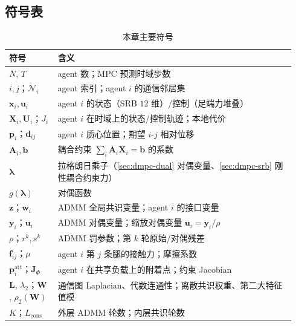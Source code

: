 \subsection*{符号表}
\begin{table}[H]\centering\small
\caption{本章主要符号}
\label{tab:dmpc-symbols}
\begin{tabular}{p{0.16\linewidth}p{0.78\linewidth}}
\toprule
符号 & 含义 \\
\midrule
$N$, $T$ & agent 数；MPC 预测时域步数 \\
$i,j$；$\mathcal{N}_i$ & agent 索引；agent $i$ 的通信邻居集 \\
$\mathbf{x}_i,\mathbf{u}_i$ & agent $i$ 的状态（SRB $12$ 维）/控制（足端力堆叠） \\
$\mathbf{X}_i,\mathbf{U}_i$；$J_i$ & agent $i$ 在时域上的状态/控制轨迹；本地代价 \\
$\mathbf{p}_i$；$\mathbf{d}_{ij}$ & agent $i$ 质心位置；期望 $i$-$j$ 相对位移 \\
$\mathbf{A}_i,\mathbf{b}$ & 耦合约束 $\sum_i \mathbf{A}_i\mathbf{X}_i=\mathbf{b}$ 的系数 \\
$\boldsymbol{\lambda}$ & 拉格朗日乘子（\cref{sec:dmpc-dual} 对偶变量、\cref{sec:dmpc-srb} 刚性耦合约束力） \\
$g(\boldsymbol{\lambda})$ & 对偶函数 \\
$\mathbf{z}$；$\mathbf{w}_i$ & ADMM 全局共识变量；agent $i$ 的接口变量 \\
$\mathbf{y}_i$；$\mathbf{u}_i$ & ADMM 对偶变量；缩放对偶变量 $\mathbf{u}_i=\mathbf{y}_i/\rho$ \\
$\rho$；$r^k,s^k$ & ADMM 罚参数；第 $k$ 轮原始/对偶残差 \\
$\mathbf{f}_{ij}$；$\mu$ & agent $i$ 第 $j$ 条腿的接触力；摩擦系数 \\
$\mathbf{p}_i^{\text{att}}$；$\mathbf{J}_\Phi$ & agent $i$ 在共享负载上的附着点；约束 Jacobian \\
$\mathbf{L}$, $\lambda_2$；$\mathbf{W}$, $\rho_2(\mathbf{W})$ & 通信图 Laplacian、代数连通性；离散共识权重、第二大特征值模 \\
$K$；$L_{\text{cons}}$ & 外层 ADMM 轮数；内层共识轮数 \\
\bottomrule
\end{tabular}
\end{table}

